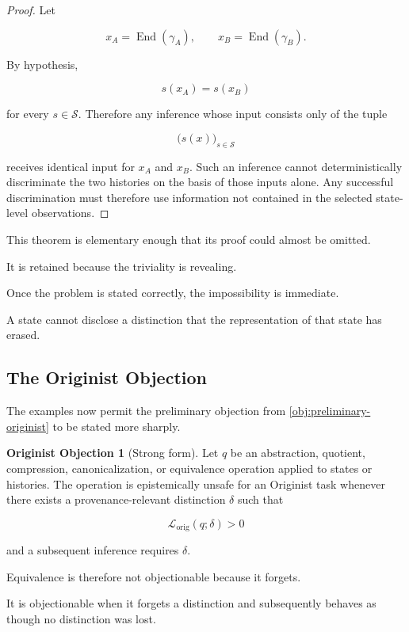 \documentclass[
  11pt,
  a4paper,
  DIV=12,
  BCOR=0mm,
  parskip=half-
]{scrartcl}
\newcommand{\lossorig}{%
  \mathscr L_{\mathrm{orig}}%
}
\newcommand{\End}{\operatorname{End}}
\theoremstyle{definition}
\newtheorem{objection}[definition]{Originist Objection}
\theoremstyle{plain}
\theoremstyle{remark}
\begin{document}
\begin{proof}
Let

\[
  x_A=\End(\gamma_A),
  \qquad
  x_B=\End(\gamma_B).
\]

By hypothesis,

\[
  s(x_A)=s(x_B)
\]

for every \(s\in\mathcal S\). Therefore any inference whose input consists
only of the tuple

\[
  \bigl(s(x)\bigr)_{s\in\mathcal S}
\]

receives identical input for \(x_A\) and \(x_B\). Such an inference cannot
deterministically discriminate the two histories on the basis of those inputs
alone. Any successful discrimination must therefore use information not
contained in the selected state-level observations.
\end{proof}

This theorem is elementary enough that its proof could almost be omitted.

It is retained because the triviality is revealing.

Once the problem is stated correctly, the impossibility is immediate.

A state cannot disclose a distinction that the representation of that state
has erased.


\subsection{The Originist Objection}
\label{sec:originist-objection-strong}

The examples now permit the preliminary objection from
\cref{obj:preliminary-originist} to be stated more sharply.

\begin{objection}[Strong form]
\label{obj:strong-originist}
Let \(q\) be an abstraction, quotient, compression, canonicalization, or
equivalence operation applied to states or histories. The operation is
epistemically unsafe for an Originist task whenever there exists a
provenance-relevant distinction \(\delta\) such that

\[
  \lossorig(q;\delta)>0
\]

and a subsequent inference requires \(\delta\).

Equivalence is therefore not objectionable because it forgets.

It is objectionable when it forgets a distinction and subsequently behaves as
though no distinction was lost.
\end{objection}
\end{document}

